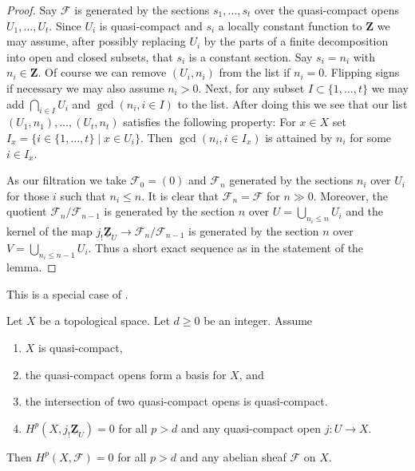\begin{proof}
Say $\mathcal{F}$ is generated by the sections $s_1, \ldots, s_t$ over the
quasi-compact opens $U_1, \ldots, U_t$. Since $U_i$ is quasi-compact and
$s_i$ a locally constant function to $\mathbf{Z}$ we may assume, after
possibly replacing $U_i$ by the parts of a finite decomposition into open
and closed subsets, that $s_i$ is a constant section.
Say $s_i = n_i$ with $n_i \in \mathbf{Z}$. Of course we can remove
$(U_i, n_i)$ from the list if $n_i = 0$. Flipping signs if necessary
we may also assume $n_i > 0$. Next, for any subset $I \subset \{1, \ldots, t\}$
we may add $\bigcap_{i \in I} U_i$ and $\gcd(n_i, i \in I)$ to the list.
After doing this we see that our list $(U_1, n_1), \ldots, (U_t, n_t)$
satisfies the following property:
For $x \in X$ set $I_x = \{i \in \{1, \ldots, t\} \mid x \in U_i\}$.
Then $\gcd(n_i, i \in I_x)$ is attained by $n_i$ for some $i \in I_x$.

\medskip\noindent
As our filtration we take $\mathcal{F}_0 = (0)$ and
$\mathcal{F}_n$ generated by the sections $n_i$ over $U_i$ for those
$i$ such that $n_i \leq n$. It is clear that
$\mathcal{F}_n = \mathcal{F}$ for $n \gg 0$. Moreover, the quotient
$\mathcal{F}_n/\mathcal{F}_{n - 1}$ is generated by the section
$n$ over $U = \bigcup_{n_i \leq n} U_i$ and the kernel of the map
$j_!\underline{\mathbf{Z}}_U \to \mathcal{F}_n/\mathcal{F}_{n - 1}$
is generated by the section $n$ over $V = \bigcup_{n_i \leq n - 1} U_i$.
Thus a short exact sequence as in the statement of the lemma.
\end{proof}

\begin{lemma}
\label{lemma-vanishing-generated-one-section}
\begin{reference}
This is a special case of \cite[Proposition 3.6.1]{Tohoku}.
\end{reference}
Let $X$ be a topological space. Let $d \geq 0$ be an integer. Assume
\begin{enumerate}
\item $X$ is quasi-compact,
\item the quasi-compact opens form a basis for $X$, and
\item the intersection of two quasi-compact opens is quasi-compact.
\item $H^p(X, j_!\underline{\mathbf{Z}}_U) = 0$ for all $p > d$
and any quasi-compact open $j : U \to X$.
\end{enumerate}
Then $H^p(X, \mathcal{F}) = 0$ for all $p > d$
and any abelian sheaf $\mathcal{F}$ on $X$.
\end{lemma}


